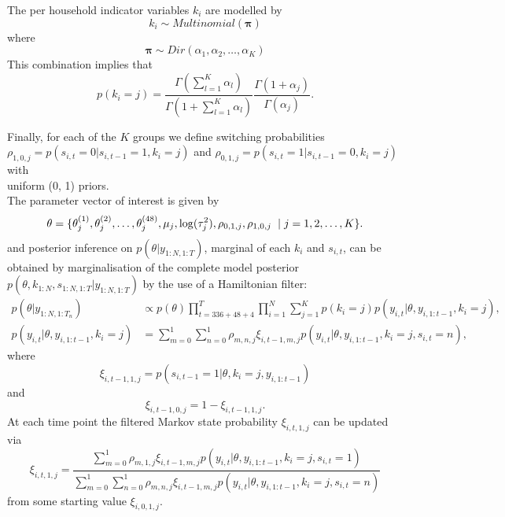\documentclass[
12pt, %
onehalfspacing, %
nohyperref, %
headsepline, %
chapterinoneline, %
]{MastersDoctoralThesis} %
\begin{document}
The per household indicator variables $k_i$ are modelled by
\begin{equation} 
\label{elec:kConditional}
k_i \sim Multinomial(\boldsymbol{\pi})
\end{equation}
where 
\begin{equation}
\label{elec:piPrior}
\boldsymbol{\pi} \sim Dir(\alpha_1, \alpha_2, \dots, \alpha_K)
\end{equation}
This combination implies that
\begin{equation}
\label{elec:kMarginal}
p(k_i = j) = \frac{\Gamma(\sum_{l=1}^K \alpha_l)}{\Gamma(1 + \sum_{l=1}^K \alpha_l)} \frac{\Gamma(1 + \alpha_j)}{\Gamma(\alpha_j)}.
\end{equation}

Finally, for each of the $K$ groups we define switching probabilities \\ $\rho_{1, 0, j} = p(s_{i, t} = 0 | s_{i, t-1} = 1, k_i = j)$ and $\rho_{0, 1, j} = p(s_{i, t} = 1 | s_{i, t-1} = 0, k_i = j)$ with \\ uniform (0, 1) priors. 
\\

The parameter vector of interest is given by 
\begin{equation}
\label{electricityTheta}
\theta = \{\theta^{(1)}_j, \theta^{(2)}_j, \dots, \theta^{(48)}_j, \mu_j, \log(\tau^2_j), \rho_{0, 1, j}, \rho_{1, 0, j} \hspace{2mm} | \hspace{1mm} j = 1, 2, \dots, K\}.
\end{equation}
and posterior inference on $p(\theta | y_{1:N, 1:T})$, marginal of each $k_i$ and $s_{i, t}$, can be obtained by marginalisation of the complete model posterior $p(\theta, k_{1:N}, s_{1:N, 1:T} | y_{1:N, 1:T})$ by the use of a Hamiltonian filter:
\begin{align}
\label{elec:Hfilter}
p(\theta | y_{1:N, 1:T_n}) &\propto p(\theta)  \prod_{t=336 + 48 + 4}^{T} \prod_{i=1}^N  \sum_{j=1}^K p(k_i = j) p(y_{i, t} | \theta, y_{i, 1:t-1}, k_i = j), \\
p(y_{i, t} | \theta, y_{i, 1:t-1}, k_i = j) &= \sum_{m=0}^1 \sum_{n=0}^1  \rho_{m, n, j} \xi_{i, t-1, m, j}  p(y_{i, t} | \theta, y_{i, 1:t-1}, k_i = j, s_{i, t} = n),
\end{align}
where
\begin{equation}
\xi_{i, t-1, 1, j} = p(s_{i, t-1} = 1 | \theta, k_i = j, y_{i, 1:t-1})
\end{equation}
and
\begin{equation}
\xi_{i, t-1, 0, j} = 1 - \xi_{i, t-1, 1, j}.
\end{equation}
At each time point the filtered Markov state probability $\xi_{i, t, 1, j}$ can be updated via
\begin{equation}
\xi_{i, t, 1, j} = \frac{\sum_{m=0}^1 \rho_{m, 1, j} \xi_{i, t-1, m, j} p(y_{i, t} | \theta, y_{i, 1:t-1}, k_i = j, s_{i, t} = 1)}{\sum_{m=0}^1 \sum_{n=0}^1 \rho_{m, n, j} \xi_{i, t-1, m, j}p(y_{i, t} | \theta, y_{i, 1:t-1}, k_i = j, s_{i, t} = n)}
\end{equation}
from some starting value $\xi_{i, 0, 1, j}$.
\\
\fi
\end{document}
